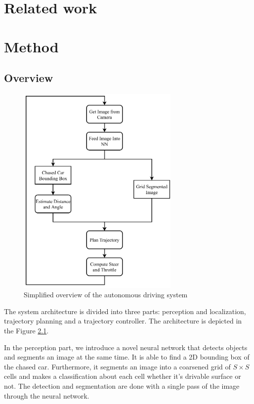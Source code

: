 \chapter{Related work}




\chapter{Method}
\section{Overview}
\begin{figure}[]
    \centering
    \includegraphics[width=0.7\textwidth]{images/bachelor_diagram.pdf}
    \caption{Simplified overview of the autonomous driving system}\label{f:overview}
\end{figure}

The system architecture is divided into three parts: perception and localization, trajectory planning and a trajectory controller. The architecture is depicted in the Figure \ref{f:overview}. \par


In the perception part, we introduce a novel neural network that detects objects and segments an image at the same time. It is able to find a 2D bounding box of the chased car. Furthermore, it segments an image into a coarsened grid of $S\times S$ cells and makes a classification about each cell whether it's drivable surface or not. The detection and segmentation are done with a single pass of the image through the neural network. \par


